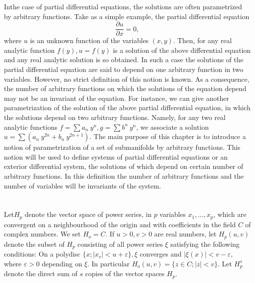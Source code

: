 In\pageoriginale the case of partial differential equations,  the solutions are
often parametrized by arbitrary functions. Take as a simple example,
the partial differential equation 
$$
\frac{\partial u}{\partial x}  =0, 
$$
where $u$ is an unknown function of the variables $(x,  y)$. Then,
for any real analytic function $f(y),  u = f(y)$ is a solution of the
above differential equation and any real analytic solution is so
obtained. In such a case the solutions of the partial differential
equation are said to depend on one arbitrary function in two
variables. However,  no strict definition of this notion is known. As
a consequence,  the number of arbitrary functions on which the
solutions of the equation depend may not be an invariant of the
equation. For instance,  we can give another parametrization of the
solution of the above partial differential equation,  in which the
solutions depend on two arbitrary functions. Namely,  for any two real
analytic functions $f = \sum a_n ~ y^n,  g = \sum b^n ~ y^n$,  we
associate a solution $u = \sum (a_n ~ y^{2n} + b_n ~ y^{2n+1})$. The
main purpose of this chapter is to introduce a notion of
parametrization of a set of submanifolds by arbitrary functions. This
notion will be used to define systems of partial differential equations
or an exterior differential system,  the solutions of which depend on
certain number of arbitrary functions. In this definition the number
of arbitrary functions and the number of variables will be invariants
of the system. 

\section{}\label{chap1:sec1.2} %

Let\pageoriginale $H_p$ denote the vector space of power series,  in $p$ variables
$x_1,  \ldots,  x_p$,  which are convergent on a neighbourhood of the
origin and with coefficients in the field $C$ of complex numbers. We
set $H_o = C$. If $u > 0,  v > 0$ are real numbers,  let $H_p(u,  v)$
denote the subset of $H_p$ consisting of all power series $\xi$
satisfying the following conditions: On a polydisc $\{ x; | x_r | < u
+ \varepsilon\},  \xi$ converges and $| \xi (x) | < v - \varepsilon$,
where $\varepsilon > 0$ depending on $\xi$. In particular $H_o (u, v)
= \{ z \in C; | z | < v \}$. Let $H^s_p$ denote the direct sum of $s$
copies of the vector spaces $H_p$. 

